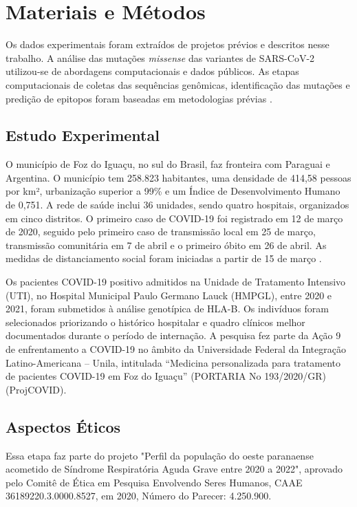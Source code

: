 \chapter{Materiais e Métodos}

\begin{justify}

\hspace{12 mm} Os dados experimentais foram extraídos de projetos prévios e descritos nesse trabalho. A análise das mutações \textit{missense} das variantes de SARS-CoV-2 utilizou-se de abordagens computacionais e dados públicos. As etapas computacionais de coletas das sequências genômicas, identificação das mutações e predição de epitopos  foram baseadas em metodologias prévias \cite{Hamelin:2022}.  


\section{Estudo Experimental}

O município de Foz do Iguaçu, no sul do Brasil, faz fronteira com Paraguai e Argentina. O município tem 258.823 habitantes, uma densidade de 414,58 pessoas por km², urbanização superior a 99\% e um Índice de Desenvolvimento Humano de 0,751. A rede de saúde inclui 36 unidades, sendo quatro hospitais, organizados em cinco distritos. O primeiro caso de COVID-19 foi registrado em 12 de março de 2020, seguido pelo primeiro caso de transmissão local em 25 de março, transmissão comunitária em 7 de abril e o primeiro óbito em 26 de abril.  As medidas de distanciamento social foram iniciadas a partir de 15 de março \cite{Viana:2021}.

Os pacientes COVID-19 positivo admitidos na Unidade de Tratamento Intensivo (UTI), no Hospital Municipal Paulo Germano Lauck (HMPGL), entre 2020 e 2021, foram submetidos à análise genotípica de HLA-B. Os indivíduos foram selecionados priorizando o histórico hospitalar e quadro clínicos melhor documentados durante o período de internação.  A pesquisa fez parte da  Ação 9 de enfrentamento a COVID-19 no âmbito da Universidade Federal da Integração Latino-Americana – Unila, intitulada “Medicina personalizada para tratamento de pacientes COVID-19 em Foz do Iguaçu” (PORTARIA No 193/2020/GR) (ProjCOVID).

\section{Aspectos Éticos}

Essa etapa faz parte do projeto "Perfil da população do oeste paranaense acometido de Síndrome Respiratória Aguda Grave entre 2020 a 2022", aprovado pelo Comitê de Ética em Pesquisa Envolvendo Seres Humanos, CAAE 36189220.3.0000.8527, em 2020,  Número do Parecer: 4.250.900.


\end{justify}
